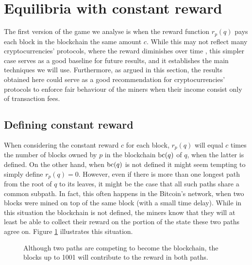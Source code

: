 

\section{Equilibria %
with constant reward}
\label{sec-const_rew}

The first version of the game we analyse is when the reward function $r_p(q)$ pays each block in the blockchain the same amount $c$. While this may not reflect many cryptocurrencies' protocols, where the reward diminishes over time \cite{Bitcoin,DBLP:books/daglib/0040621,NC17,Monero,Litecoin,Bcash}, this simpler case serves as a good baseline for future results, and it establishes the main techniques we will use. Furthermore, as argued in this section, the results obtained here could serve as a good recommendation for cryptocurrencies' protocols to enforce fair behaviour of the miners when their income consist only of transaction fees.


\subsection{Defining constant reward}
When considering the constant reward $c$ for each block, $r_p(q)$ will equal $c$ times the number of blocks owned by $p$ in the blockchain $\text{bc}(q)$ of $q$, when the latter is defined. On the other hand, when $\text{bc}(q)$ is not defined it might seem tempting to simply define $r_p(q) = 0$. However, even if there is more than one longest path from the root of $q$ to its leaves, it might be the case that all such paths share a common subpath. In fact, this often happens in the Bitcoin's network, when two blocks were mined on top of the same block (with a small time delay). While in this situation the blockchain is not defined, the miners know that they will at least be able to collect their reward on the portion of the state these two paths agree on. Figure \ref{fig-simple-fork} illustrates this situation. 

\begin{figure}
\centering
{} 
\caption{Although two paths are competing to become the blockchain, the blocks up to 1001 will contribute to the reward in both paths. \label{fig-simple-fork}}
\end{figure}


